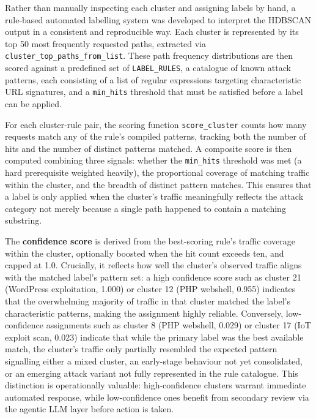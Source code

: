 \documentclass[12pt, a4paper]{report}   %
\begin{document}
Rather than manually inspecting each cluster and assigning labels by hand, a 
rule-based automated labelling system was developed to interpret the HDBSCAN 
output in a consistent and reproducible way. Each cluster is represented by its 
top 50 most frequently requested paths, extracted via \texttt{cluster\_top\_paths\_from\_list}. 
These path frequency distributions are then scored against a predefined set of 
\texttt{LABEL\_RULES}, a catalogue of known attack patterns, each consisting of 
a list of regular expressions targeting characteristic URL signatures, and a 
\texttt{min\_hits} threshold that must be satisfied before a label can be applied.

For each cluster-rule pair, the scoring function \texttt{score\_cluster} counts 
how many requests match any of the rule's compiled patterns, tracking both the 
number of hits and the number of distinct patterns matched. A composite score is 
then computed combining three signals: whether the \texttt{min\_hits} threshold 
was met (a hard prerequisite weighted heavily), the proportional coverage of 
matching traffic within the cluster, and the breadth of distinct pattern matches. 
This ensures that a label is only applied when the cluster's traffic meaningfully 
reflects the attack category not merely because a single path happened to 
contain a matching substring.

The \textbf{confidence score} is derived from the best-scoring rule's traffic 
coverage within the cluster, optionally boosted when the hit count exceeds ten, 
and capped at 1.0. Crucially, it reflects how well the cluster's observed traffic 
aligns with the matched label's pattern set: a high confidence score such as 
cluster 21 (WordPress exploitation, 1.000) or cluster 12 (PHP webshell, 0.955) 
indicates that the overwhelming majority of traffic in that cluster matched the 
label's characteristic patterns, making the assignment highly reliable. 
Conversely, low-confidence assignments such as cluster 8 (PHP webshell, 0.029) 
or cluster 17 (IoT exploit scan, 0.023) indicate that while the primary label 
was the best available match, the cluster's traffic only partially resembled 
the expected pattern signalling either a mixed cluster, an early-stage 
behaviour not yet consolidated, or an emerging attack variant not fully 
represented in the rule catalogue. This distinction is operationally valuable: 
high-confidence clusters warrant immediate automated response, while 
low-confidence ones benefit from secondary review via the agentic LLM layer 
before action is taken.
\end{document}
